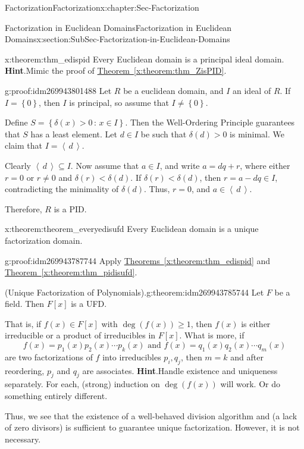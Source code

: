 \documentclass[oneside,10pt,]{book}
\numberwithin{equation}{section}
\renewcommand{\ge}{\geqslant}
\newcommand{\ideal}[1]{\left\langle\, #1 \,\right\rangle}
\newcommand{\set}[1]{\left\{ {#1} \right\}}
\newcommand{\setof}[2]{{\left\{#1\,\colon\,#2\right\}}}
\newcommand{\lt}{<}
\begin{document}
\begin{chapterptx}{Factorization}{}{Factorization}{}{}{x:chapter:Sec-Factorization}
\begin{sectionptx}{Factorization in Euclidean Domains}{}{Factorization in Euclidean Domains}{}{}{x:section:SubSec-Factorization-in-Euclidean-Domains}
\begin{theorem}{}{}{x:theorem:thm_edispid}
Every Euclidean domain is a principal ideal domain.%
\textbf{Hint}.\quad{}Mimic the proof of \hyperref[x:theorem:thm_ZisPID]{Theorem~\ref{x:theorem:thm_ZisPID}}.%
\end{theorem}
\begin{proofptx}{}{g:proof:idm269943801488}
Let \(R\) be a euclidean domain, and \(I\) an ideal of \(R\). If \(I = \set{0}\), then \(I\) is principal, so assume that \(I\ne \set{0}\).%
\par
Define \(S = \setof{\delta(x)>0}{x\in I}\). Then the Well-Ordering Principle guarantees that \(S\) has a least element. Let \(d\in I\) be such that \(\delta(d) > 0\) is minimal. We claim that \(I = \ideal{d}\).%
\par
Clearly \(\ideal{d}\subseteq I\). Now assume that \(a\in I\), and write \(a = dq + r\), where either \(r = 0\) or \(r\ne 0\) and \(\delta(r) \lt \delta(d)\). If \(\delta(r) \lt \delta(d)\), then \(r = a - dq \in I\), contradicting the minimality of \(\delta(d)\). Thus, \(r = 0\), and \(a\in \ideal{d}\).%
\par
Therefore, \(R\) is a PID.%
\end{proofptx}
\begin{theorem}{}{}{x:theorem:theorem_everyedisufd}%
Every Euclidean domain is a unique factorization domain.%
\end{theorem}
\begin{proofptx}{}{g:proof:idm269943787744}
Apply \hyperref[x:theorem:thm_edispid]{Theorems~\ref{x:theorem:thm_edispid}} and \hyperref[x:theorem:thm_pidisufd]{Theorem~\ref{x:theorem:thm_pidisufd}}.%
\end{proofptx}
\begin{theorem}{(Unique Factorization of Polynomials).}{}{g:theorem:idm269943785744}%
Let \(F\) be a field. Then \(F[x]\) is a UFD.%
\par
That is, if \(f(x) \in F[x]\) with \(\deg(f(x)) \ge 1\), then \(f(x)\) is either irreducible or a product of irreducibles in \(F[x]\). What is more, if%
\begin{equation*}
f(x) = p_1(x) p_2(x) \cdots p_k(x) \text{ and }  f(x) = q_1(x) q_2(x) \cdots q_m(x)
\end{equation*}
are two factorizations of \(f\) into irreducibles \(p_i, q_j\), then \(m=k\) and after reordering, \(p_j\) and \(q_j\) are associates.%
\textbf{Hint}.\quad{}Handle existence and uniqueness separately. For each, (strong) induction on \(\deg(f(x))\) will work. Or do something entirely different.%
\end{theorem}
Thus, we see that the existence of a well-behaved division algorithm and (a lack of zero divisors) is sufficient to guarantee unique factorization. However, it is not necessary.%

\end{sectionptx}
\end{chapterptx}
\end{document}
